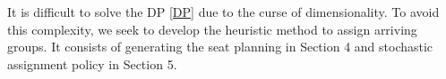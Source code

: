 It is difficult to solve the DP \eqref{DP} due to the curse of dimensionality. To avoid this complexity, we seek to develop the heuristic method to assign arriving groups. It consists of generating the seat planning in Section 4 and stochastic assignment policy in Section 5.




